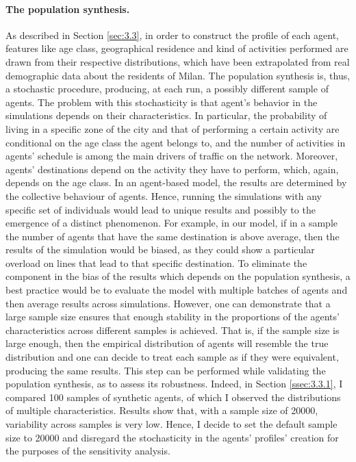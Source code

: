 \paragraph{The population synthesis.} 
As described in Section \ref{sec:3.3}, in order to construct the profile of each agent, features like age class, geographical residence and kind of activities performed are drawn from their respective distributions, which have been extrapolated from real demographic data about the residents of Milan. The population synthesis is, thus, a stochastic procedure, producing, at each run, a possibly different sample of agents. The problem with this stochasticity is that agent's behavior in the simulations depends on their characteristics. In particular, the probability of living in a specific zone of the city and that of performing a certain activity are conditional on the age class the agent belongs to, and the number of activities in agents' schedule is among the main drivers of traffic on the network. Moreover, agents' destinations depend on the activity they have to perform, which, again, depends on the age class. In an agent-based model, the results are determined by the collective behaviour of agents. Hence, running the simulations with any specific set of individuals would lead to unique results and possibly to the emergence of a distinct phenomenon. For example, in our model, if in a sample the number of agents that have the same destination is above average, then the results of the simulation would be biased, as they could show a particular overload on lines that lead to that specific destination. To eliminate the component in the bias of the results which depends on the population synthesis, a best practice would be to evaluate the model with multiple batches of agents and then average results across simulations. However, one can demonstrate that a large sample size ensures that enough stability in the proportions of the agents' characteristics across different samples is achieved. That is, if the sample size is large enough, then the empirical distribution of agents will resemble the true distribution and one can decide to treat each sample as if they were equivalent, producing the same results. This step can be performed while validating the population synthesis, as to assess its robustness. Indeed, in Section \ref{ssec:3.3.1}, I compared 100 samples of synthetic agents, of which I observed the distributions of multiple characteristics. Results show that, with a sample size of 20000, variability across samples is very low. Hence, I decide to set the default sample size to 20000 and disregard the stochasticity in the agents' profiles' creation for the purposes of the sensitivity analysis.

